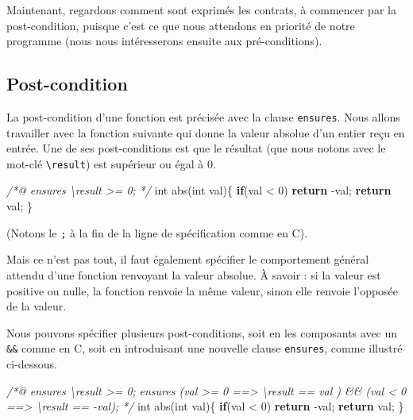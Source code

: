 \documentclass[12pt,francais,]{scrbook}
\newenvironment{Shaded}{}{}
\newcommand{\KeywordTok}[1]{\textcolor[rgb]{0.00,0.44,0.13}{\textbf{{#1}}}}
\newcommand{\DataTypeTok}[1]{\textcolor[rgb]{0.56,0.13,0.00}{{#1}}}
\newcommand{\DecValTok}[1]{\textcolor[rgb]{0.25,0.63,0.44}{{#1}}}
\newcommand{\CommentTok}[1]{\textcolor[rgb]{0.38,0.63,0.69}{\textit{{#1}}}}
\newcommand{\NormalTok}[1]{{#1}}
\begin{document}
Maintenant, regardons comment sont exprimés les contrats, à commencer
par la post-condition, puisque c'est ce que nous attendons en priorité
de notre programme (nous nous intéresserons ensuite aux pré-conditions).

\subsection{Post-condition}\label{post-condition}

La post-condition d'une fonction est précisée avec la clause
\texttt{ensures}. Nous allons travailler avec la fonction suivante qui
donne la valeur absolue d'un entier reçu en entrée. Une de ses
post-conditions est que le résultat (que nous notons avec le mot-clé
\texttt{\textbackslash{}result}) est supérieur ou égal à 0.

\begin{footnotesize}\begin{Shaded}
\begin{Highlighting}[]
\CommentTok{/*@}
\CommentTok{  ensures \textbackslash{}result >= 0;}
\CommentTok{*/}
\DataTypeTok{int} \NormalTok{abs(}\DataTypeTok{int} \NormalTok{val)\{}
  \KeywordTok{if}\NormalTok{(val < }\DecValTok{0}\NormalTok{) }\KeywordTok{return} \NormalTok{-val;}
  \KeywordTok{return} \NormalTok{val;}
\NormalTok{\}}
\end{Highlighting}
\end{Shaded}\end{footnotesize}

(Notons le \texttt{;} à la fin de la ligne de spécification comme en C).

Mais ce n'est pas tout, il faut également spécifier le comportement
général attendu d'une fonction renvoyant la valeur absolue. À savoir :
si la valeur est positive ou nulle, la fonction renvoie la même valeur,
sinon elle renvoie l'opposée de la valeur.

Nous pouvons spécifier plusieurs post-conditions, soit en les composants
avec un \texttt{\&\&} comme en C, soit en introduisant une nouvelle
clause \texttt{ensures}, comme illustré ci-dessous.

\begin{footnotesize}\begin{Shaded}
\begin{Highlighting}[]
\CommentTok{/*@}
\CommentTok{  ensures \textbackslash{}result >= 0;}
\CommentTok{  ensures (val >= 0 ==> \textbackslash{}result == val ) && }
\CommentTok{          (val <  0 ==> \textbackslash{}result == -val);}
\CommentTok{*/}
\DataTypeTok{int} \NormalTok{abs(}\DataTypeTok{int} \NormalTok{val)\{}
  \KeywordTok{if}\NormalTok{(val < }\DecValTok{0}\NormalTok{) }\KeywordTok{return} \NormalTok{-val;}
  \KeywordTok{return} \NormalTok{val;}
\NormalTok{\}}
\end{Highlighting}
\end{Shaded}\end{footnotesize}
\end{document}
